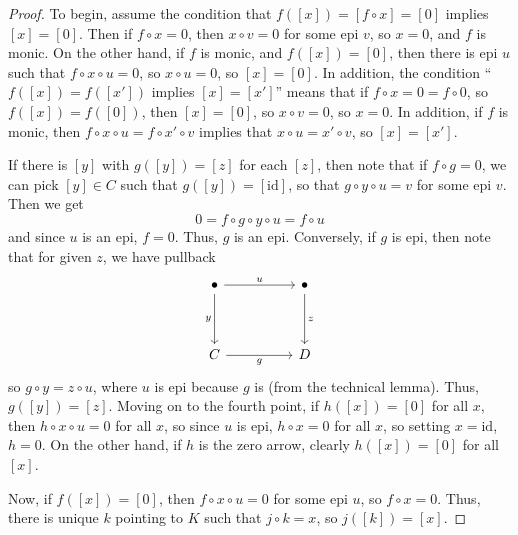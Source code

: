 \documentclass[aps,pra,showpacs,notitlepage,onecolumn,superscriptaddress,nofootinbib]{revtex4-1}
\theoremstyle{definition}
\begin{document}
\begin{proof}
  To begin, assume the condition that $f([x]) = [f \circ x] = [0]$ implies $[x] = [0]$. Then if $f \circ x = 0$, then $x \circ v = 0$ for some epi $v$, so $x = 0$, and $f$ is monic. On the other hand,
  if $f$ is monic, and $f([x]) = [0]$, then there is epi $u$ such that $f \circ x \circ u = 0$, so $x \circ u = 0$, so $[x] = [0]$. In addition, the condition ``$f([x]) = f([x'])$ implies $[x] = [x']$''
  means that if $f \circ x = 0 = f \circ 0$, so $f([x]) = f([0])$, then $[x] = [0]$, so $x \circ v = 0$, so $x = 0$. In addition, if $f$ is monic, then $f \circ x \circ u = f \circ x' \circ v$ implies
  that $x \circ u = x' \circ v$, so $[x] = [x']$.

  If there is $[y]$ with $g([y]) = [z]$ for each $[z]$, then note that if $f \circ g = 0$, we can pick $[y] \in C$ such that $g([y]) = [\text{id}]$, so that $g \circ y \circ u = v$
  for some epi $v$. Then we get
  \begin{equation}
    0 = f \circ g \circ y \circ u = f \circ u
    \end{equation}
  and since $u$ is an epi, $f = 0$. Thus, $g$ is an epi. Conversely, if $g$ is epi, then note that for given $z$, we have pullback
  \[\begin{tikzcd}
	\bullet && \bullet \\
	\\
	C && D
	\arrow["u", from=1-1, to=1-3]
	\arrow["y"', from=1-1, to=3-1]
	\arrow["z", from=1-3, to=3-3]
	\arrow["g"', from=3-1, to=3-3]
  \end{tikzcd}\]
  so $g \circ y = z \circ u$, where $u$ is epi because $g$ is (from the technical lemma). Thus, $g([y]) = [z]$. Moving on to the fourth point, if $h([x]) = [0]$ for all $x$, then $h \circ x \circ u = 0$
  for all $x$, so since $u$ is epi, $h \circ x = 0$ for all $x$, so setting $x = \text{id}$, $h = 0$. On the other hand, if $h$ is the zero arrow, clearly $h([x]) = [0]$ for all $[x]$.

  Now, if $f([x]) = [0]$, then $f \circ x \circ u = 0$ for some epi $u$, so $f \circ x = 0$. Thus, there is unique $k$ pointing to $K$ such that $j \circ k = x$, so $j([k]) = [x]$.


\end{proof}
\end{document}
